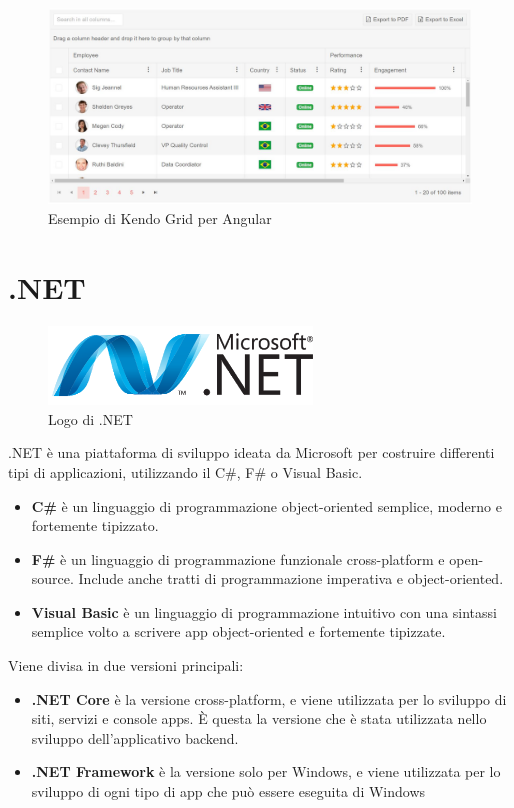 \begin{figure}[ht!]
\begin{center}
  \includegraphics[width=14cm]{images/kendo_grid.JPG}
  \caption{Esempio di Kendo Grid per Angular}
\end{center}
\end{figure}

\section{.NET}
\begin{figure}[h]
\begin{center}
	\includegraphics[width=7cm]{images/dotnet.png}
	\caption{Logo di .NET}\label{fig:dotnet}
\end{center}
\end{figure}
.NET è una piattaforma di sviluppo ideata da Microsoft per costruire differenti tipi di applicazioni, utilizzando il C\#, F\# o Visual Basic.\cite{DOTNET} 
\begin{itemize}
\item \textbf{C\#} è un linguaggio di programmazione object-oriented semplice, moderno e fortemente tipizzato.
\item \textbf{F\#} è un linguaggio di programmazione funzionale cross-platform e open-source. Include anche tratti di programmazione imperativa e object-oriented.
\item \textbf{Visual Basic} è un linguaggio di programmazione intuitivo con una sintassi semplice volto a scrivere app object-oriented e fortemente tipizzate.
\end{itemize}
Viene divisa in due versioni principali:
\begin{itemize}
\item \textbf{.NET Core} è la versione cross-platform, e viene utilizzata per lo sviluppo di siti, servizi e console apps. È questa la versione che è stata utilizzata nello sviluppo dell'applicativo backend.
\item \textbf{.NET Framework} è la versione solo per Windows, e viene utilizzata per lo sviluppo di ogni tipo di app che può essere eseguita di Windows
\end{itemize}
\pagebreak
